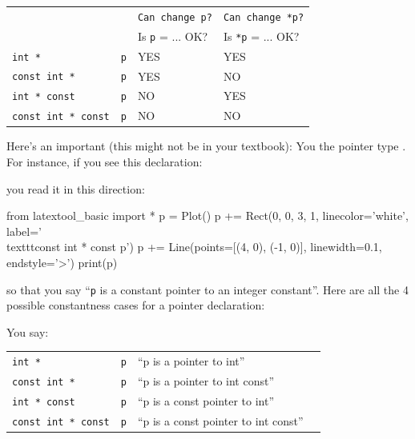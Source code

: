 
\begin{tabular}{l l l l}
    & & \texttt{Can change p?} & \texttt{Can change *p?} \\
    & & Is \texttt{p} = ... OK? & Is \texttt{*p} = ... OK? \\
    \texttt{int *} & \texttt{p} & YES & YES \\
    \texttt{const int *} & \texttt{p} & YES & NO \\
    \texttt{int * const} & \texttt{p} & NO & YES \\
    \texttt{const int * const} & \texttt{p} & NO & NO \\
\end{tabular}

Here's an important  (this might not be in your textbook): You  the pointer type . For instance, if you see this declaration:


you read it in this direction:
\begin{python}
from latextool_basic import *
p = Plot()
p += Rect(0, 0, 3, 1, linecolor='white', label='\\texttt{const int * const p}')
p += Line(points=[(4, 0), (-1, 0)], linewidth=0.1, endstyle='>')
print(p)
\end{python}    
so that you say ``\texttt{p} is a constant pointer to an integer constant''. Here are all the 4 possible constantness cases for a pointer declaration:

You say:




\begin{tabular}{l l l l}
    \texttt{int *} & \texttt{p} &  ``p is a pointer to int'' \\
    \texttt{const int *} & \texttt{p} &  ``p is a pointer to int const''\\
    \texttt{int * const} & \texttt{p} &  ``p is a const pointer to int'' \\
    \texttt{const int * const} & \texttt{p} &  ``p is a const pointer to int const''\\
\end{tabular}


